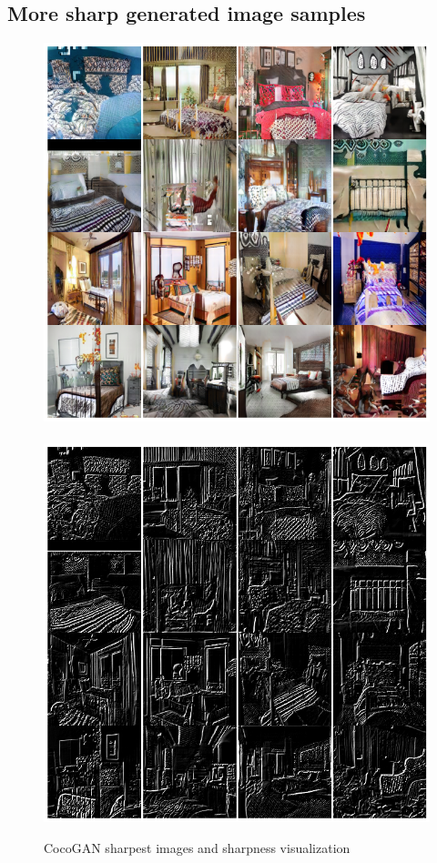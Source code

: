 \documentclass{article}
\begin{document}
    \subsection{More sharp generated image samples}
       \begin{figure}[H]
          \centering
          \includegraphics[scale=0.28]{sharpness-images/moresharpness_coco.png}
          \ \ 
          \includegraphics[scale=0.28]{sharpness-images/moresharpness_lines_coco.png}\\
          \caption{CocoGAN sharpest images and sharpness visualization}
        \end{figure}
\end{document}
